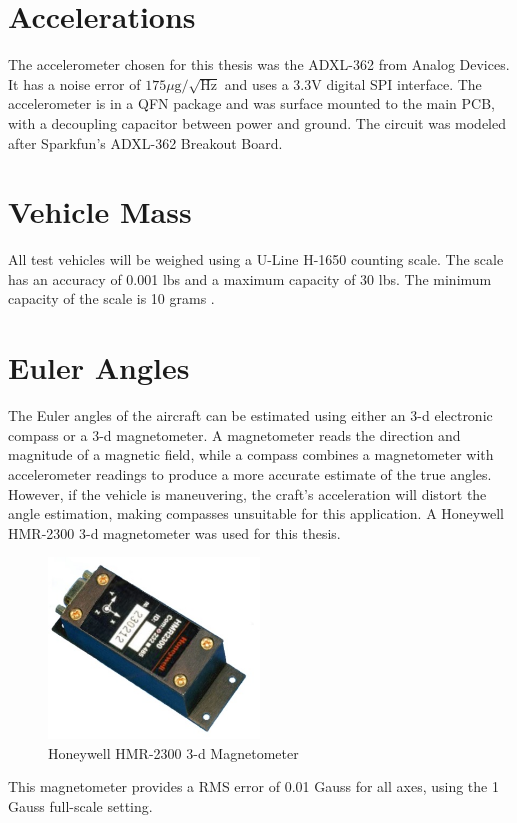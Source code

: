\section{Accelerations}
The accelerometer chosen for this thesis was the ADXL-362 from Analog Devices. It has a noise error of $175\mu\text{g}/\sqrt{\text{Hz}}$ and uses a 3.3V digital SPI interface\cite{adxl362DataSheet}. The accelerometer is in a QFN package and was surface mounted to the main PCB, with a decoupling capacitor between power and ground. The circuit was modeled after Sparkfun's ADXL-362 Breakout Board\cite{Sparkfunadxl362BOB}.

\section{Vehicle Mass}
All test vehicles will be weighed using a U-Line H-1650 counting scale. The scale has an accuracy of 0.001 lbs and a maximum capacity of 30 lbs. The minimum capacity of the scale is 10 grams \cite{U-Line}.
\section{Euler Angles}
The Euler angles of the aircraft can be estimated using either an 3-d electronic compass or a 3-d magnetometer. A magnetometer reads the direction and magnitude of a magnetic field, while a compass combines a magnetometer with accelerometer readings to produce a more accurate estimate of the true angles. However, if the vehicle is maneuvering, the craft's acceleration will distort the angle estimation, making compasses unsuitable for this application. A Honeywell HMR-2300 3-d magnetometer was used for this thesis. 

\begin{figure}[H]
  \caption{Honeywell HMR-2300 3-d Magnetometer } \label{hmr23000Picture}
  \centering
    \includegraphics[width=0.5\textwidth]{figures/hmr2300.jpg}
\end{figure}
This magnetometer provides a RMS error of 0.01 Gauss for all axes, using the 1 Gauss full-scale setting\cite{hmr2300DataSheet}. 

